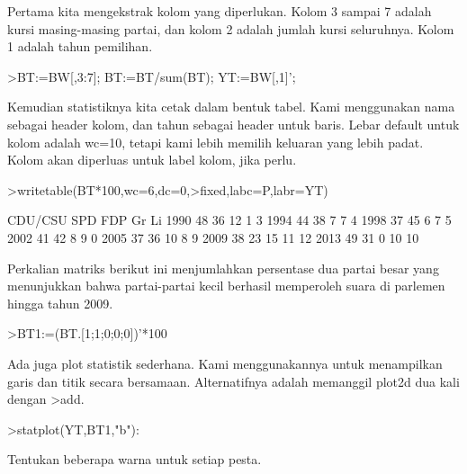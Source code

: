 \documentclass[a4paper,10pt]{article}
\begin{document}
\begin{eulernotebook}
\begin{eulercomment}
\begin{eulercomment}
\begin{eulercomment}
Pertama kita mengekstrak kolom yang diperlukan. Kolom 3 sampai 7
adalah kursi masing-masing partai, dan kolom 2 adalah jumlah kursi
seluruhnya. Kolom 1 adalah tahun pemilihan.
\end{eulercomment}
\begin{eulerprompt}
>BT:=BW[,3:7]; BT:=BT/sum(BT); YT:=BW[,1]';
\end{eulerprompt}
\begin{eulercomment}
Kemudian statistiknya kita cetak dalam bentuk tabel. Kami menggunakan
nama sebagai header kolom, dan tahun sebagai header untuk baris. Lebar
default untuk kolom adalah wc=10, tetapi kami lebih memilih keluaran
yang lebih padat. Kolom akan diperluas untuk label kolom, jika perlu.
\end{eulercomment}
\begin{eulerprompt}
>writetable(BT*100,wc=6,dc=0,>fixed,labc=P,labr=YT)
\end{eulerprompt}
\begin{euleroutput}
         CDU/CSU   SPD   FDP    Gr    Li
    1990      48    36    12     1     3
    1994      44    38     7     7     4
    1998      37    45     6     7     5
    2002      41    42     8     9     0
    2005      37    36    10     8     9
    2009      38    23    15    11    12
    2013      49    31     0    10    10
\end{euleroutput}
\begin{eulercomment}
Perkalian matriks berikut ini menjumlahkan persentase dua partai besar
yang menunjukkan bahwa partai-partai kecil berhasil memperoleh suara
di parlemen hingga tahun 2009.
\end{eulercomment}
\begin{eulerprompt}
>BT1:=(BT.[1;1;0;0;0])'*100
\end{eulerprompt}
\begin{euleroutput}
  [84.29,  81.25,  81.1659,  82.7529,  72.9642,  61.8971,  79.8732]
\end{euleroutput}
\begin{eulercomment}
Ada juga plot statistik sederhana. Kami menggunakannya untuk
menampilkan garis dan titik secara bersamaan. Alternatifnya adalah
memanggil plot2d dua kali dengan \textgreater{}add.
\end{eulercomment}
\begin{eulerprompt}
>statplot(YT,BT1,"b"):
\end{eulerprompt}
\begin{eulercomment}
Tentukan beberapa warna untuk setiap pesta.
\end{eulercomment}

\end{eulercomment}
\end{eulercomment}
\end{eulernotebook}
\end{document}

